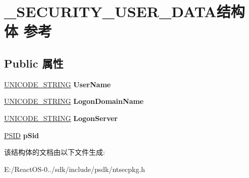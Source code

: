 \hypertarget{struct___s_e_c_u_r_i_t_y___u_s_e_r___d_a_t_a}{}\section{\+\_\+\+S\+E\+C\+U\+R\+I\+T\+Y\+\_\+\+U\+S\+E\+R\+\_\+\+D\+A\+T\+A结构体 参考}
\label{struct___s_e_c_u_r_i_t_y___u_s_e_r___d_a_t_a}
\subsection*{Public 属性}
\begin{DoxyCompactItemize}
\item 
\mbox{\label{struct___s_e_c_u_r_i_t_y___u_s_e_r___d_a_t_a_ada7f8f4ff43c1b005b05e7fea6bfda0e}} 
\hyperlink{struct___u_n_i_c_o_d_e___s_t_r_i_n_g}{U\+N\+I\+C\+O\+D\+E\+\_\+\+S\+T\+R\+I\+NG} {\bfseries User\+Name}
\item 
\mbox{\label{struct___s_e_c_u_r_i_t_y___u_s_e_r___d_a_t_a_a805529e6e8f38c807cf5e9bcf2d21a90}} 
\hyperlink{struct___u_n_i_c_o_d_e___s_t_r_i_n_g}{U\+N\+I\+C\+O\+D\+E\+\_\+\+S\+T\+R\+I\+NG} {\bfseries Logon\+Domain\+Name}
\item 
\mbox{\label{struct___s_e_c_u_r_i_t_y___u_s_e_r___d_a_t_a_a6f9627efda0deb601b303eab2da9a24f}} 
\hyperlink{struct___u_n_i_c_o_d_e___s_t_r_i_n_g}{U\+N\+I\+C\+O\+D\+E\+\_\+\+S\+T\+R\+I\+NG} {\bfseries Logon\+Server}
\item 
\mbox{\label{struct___s_e_c_u_r_i_t_y___u_s_e_r___d_a_t_a_a723cac657279552dff0784254a8dcae6}} 
\hyperlink{struct___s_i_d}{P\+S\+ID} {\bfseries p\+Sid}
\end{DoxyCompactItemize}


该结构体的文档由以下文件生成\+:\begin{DoxyCompactItemize}
\item 
E\+:/\+React\+O\+S-\/0../sdk/include/psdk/ntsecpkg.\+h\end{DoxyCompactItemize}
